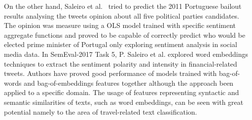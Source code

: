 On the other hand, Saleiro et al.~\cite{saleiro2016sentiment} tried to predict the 2011 Portuguese bailout results analysing the tweets opinion about all five political parties candidates. The opinion was measure using a OLS model trained with specific sentiment aggregate functions and proved to be capable of correctly predict who would be elected prime minister of Portugal only exploring sentiment analysis in social media data. In SemEval-2017 Task 5, P. Saleiro et al. explored word embeddings techniques to extract the sentiment polarity and intensity in financial-related tweets. Authors have proved good performance of models trained with bag-of-words and bag-of-embeddings features together although the approach been applied to a specific domain. The usage of features representing syntactic and semantic similarities of texts, such as word embeddings, can be seen with great potential namely to the area of travel-related text classification.

